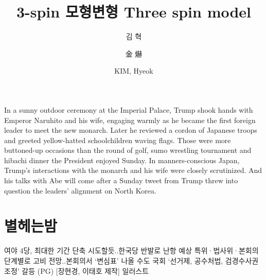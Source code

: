 \documentclass[final,doctor,korean,pdfdoc]{konkukthesis}
\title[korean]{3-spin 모형변형 }
\title[english]{Three spin model}
\title[subtitle]{}
\author[korean]{김 혁}
\author[hanja]{金 爀}
\author[english]{KIM, Hyeok}
\begin{document}
\makecontents
  \begin{abstractEng}
In a sunny outdoor ceremony at the Imperial Palace, Trump shook hands with Emperor Naruhito and his wife, engaging warmly as he became the first foreign leader to meet the new monarch. Later he reviewed a cordon of Japanese troops and greeted yellow-hatted schoolchildren waving flags.
Those were more buttoned-up occasions than the round of golf, sumo wrestling tournament and hibachi dinner the President enjoyed Sunday. In manners-conscious Japan, Trump's interactions with the monarch and his wife were closely scrutinized. And his talks with Abe will come after a Sunday tweet from Trump threw into question the leaders' alignment on North Korea.
  \end{abstractEng}
\main
\chapter{별헤는밤 }
여야 4당, 최대한 기간 단축 시도할듯..한국당 반발로 난항 예상
특위·법사위·본회의 단계별로 고비 전망..본회의서 `변심표' 나올 수도
국회 `선거제, 공수처법, 검경수사권 조정' 갈등 (PG) [장현경, 이태호 제작] 일러스트
% 
% 
% 
% 
% 
% 
% 
% 
% 
\end{document}
